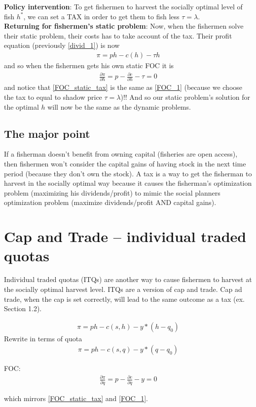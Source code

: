 \documentclass{article}
\begin{document}
\textbf{Policy intervention}: To get fishermen to harvest the socially optimal level of fish $h^*$, we can set a TAX in order to get them to fish less $\tau = \lambda$. \\

\textbf{Returning for fishermen's static problem}: Now, when the fishermen solve their static problem, their costs has to take account of the tax. Their profit equation (previously \ref{divid_1}) is now 
\begin{align}
    \pi = ph - c(h) - \tau h
\end{align}
and so when the fishermen gets his own static FOC it is
\begin{align}
    \frac{\partial \pi}{\partial h} = p - \frac{\partial c}{\partial h}- \tau = 0 \label{FOC_static_tax}
\end{align}
and notice that \ref{FOC_static_tax} is the same as \ref{FOC_1} (because we choose the tax to equal to shadow price $\tau = \lambda$)!! And so our static problem's solution for the optimal $h$ will now be the same as the dynamic problems. 

\subsection{The major point}
If a fisherman doesn't benefit from owning capital (fisheries are open access), then fishermen won't consider the capital gains of having stock in the next time period (because they don't own the stock). A tax is a way to get the fisherman to harvest in the socially optimal way because it causes the fisherman's optimization problem (maximizing his dividends/profit) to mimic the social planners optimization problem (maximize dividends/profit AND capital gains). 

\section{Cap and Trade -- individual traded quotas}
Individual traded quotas (ITQs) are another way to cause fishermen to harvest at the socially optimal harvest level. ITQs are a version of cap and trade. Cap ad trade, when the cap is set correctly, will lead to the same outcome as a tax (ex. Section 1.2). 

\begin{align}
    \pi = ph - c(s,h) - y*(h - q_0)
\end{align}
Rewrite in terms of quota
\begin{align}
    \pi = ph - c(s,q) - y*(q - q_0)
\end{align}


FOC: 
\begin{align}
    \frac{\partial \pi}{\partial q} = p - \frac{\partial c}{\partial q} - y = 0
\end{align}

which mirrors \ref{FOC_static_tax} and \ref{FOC_1}. 
\end{document}

